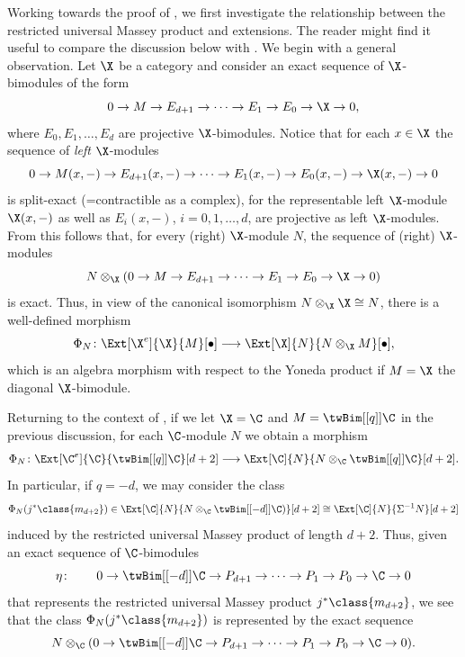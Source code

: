 \documentclass[a4paper]{amsart}
\begin{document}
Working towards the proof of , we first investigate the
relationship between the restricted universal Massey product and extensions. The
reader might find it useful to compare the discussion below with
. We begin with a general observation. Let $\X$ be a
category and consider an exact sequence of $\X$-bimodules of the form
\[
  0\to M\to E_{d+1}\to\cdots\to E_1\to E_0\to\X\to0,
\]
where $E_0,E_1,\dots, E_d$ are projective $\X$-bimodules. Notice that for each $x\in\X$ the sequence of \emph{left} $\X$-modules
\[
  0\to M(x,-)\to E_{d+1}(x,-)\to\cdots\to E_1(x,-)\to E_0(x,-)\to\X(x,-)\to0
\]
is split-exact (=contractible as a complex), for the representable left
$\X$-module $\X(x,-)$ as well as $E_i(x,-)$, $i=0,1,\dots,d$, are projective as left $\X$-modules. From
this follows that, for every (right) $\X$-module $N$, the sequence of (right)
$\X$-modules
\[
  N\otimes_\X(0\to M\to E_{d+1}\to\cdots\to E_1\to E_0\to\X\to0)
\]
is exact. Thus, in view of the canonical isomorphism $N\otimes_\X\X\cong N$,
there is a well-defined morphism
\[
  \Phi_N\colon\Ext[\X^e]{\X}{M}[\bullet]\longrightarrow\Ext[\X]{N}{N\otimes_\X
    M}[\bullet],
\]
which is an algebra morphism with respect to the Yoneda product if $M=\X$ the
diagonal $\X$-bimodule.

Returning to the context of , if we let
$\X=\C$ and $M=\twBim[[q]]{\C}$ in the previous discussion, for each $\C$-module
$N$ we obtain a morphism
\[
  \Phi_N\colon\Ext[\C^e]{\C}{\twBim[[q]]{\C}}[d+2]\longrightarrow\Ext[\C]{N}{N\otimes_\C\twBim[[q]]{\C}}[d+2].
\]
In particular, if $q=-d$, we may consider the class
\[
  \Phi_N(j^*\class{m_{d+2}})\in\Ext[\C]{N}{N\otimes_\C\twBim[[-d]]{\C})}[d+2]\cong\Ext[\C]{N}{\Sigma^{-1}N}[d+2]
\]
induced by the restricted universal Massey product of length $d+2$. Thus, given
an exact sequence of $\C$-bimodules
\[
  \eta\colon\qquad 0\to\twBim[[-d]]{\C}\to P_{d+1}\to\cdots\to P_1\to
  P_0\to\C\to0
\]
that represents the restricted universal Massey product $j^*\class{m_{d+2}}$, we
see that the class $\Phi_N(j^*\class{m_{d+2}})$ is represented by the exact
sequence
\[
  N\otimes_\C(0\to\twBim[[-d]]{\C}\to P_{d+1}\to\cdots\to P_1\to P_0\to\C\to0).
\]
\end{document}
